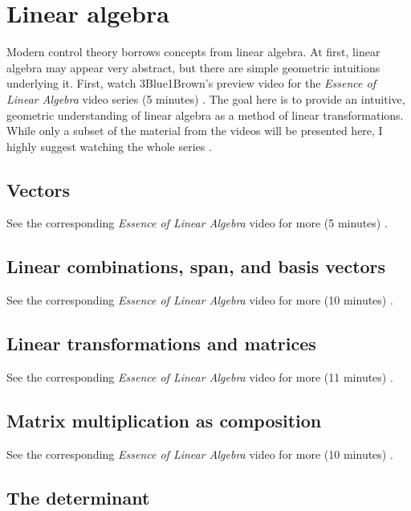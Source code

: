 \chapter{Linear algebra}

Modern control theory borrows concepts from linear algebra. At first, linear
algebra may appear very abstract, but there are simple geometric intuitions
underlying it. First, watch 3Blue1Brown's preview video for the
\textit{Essence of Linear Algebra} video series (5 minutes)
\cite{bib:linalg_preview}. The goal here is to provide an intuitive, geometric
understanding of linear algebra as a method of linear transformations. \\

While only a subset of the material from the videos will be presented here, I
highly suggest watching the whole series \cite{bib:essence_of_linalg}.

\section{Vectors}

See the corresponding \textit{Essence of Linear Algebra} video for more (5
minutes) \cite{bib:linalg_vectors}.

\section{Linear combinations, span, and basis vectors}

See the corresponding \textit{Essence of Linear Algebra} video for more (10
minutes) \cite{bib:linalg_linear_combinations}.

\section{Linear transformations and matrices}

See the corresponding \textit{Essence of Linear Algebra} video for more (11
minutes) \cite{bib:linalg_linear_transformations_and_matrices}.

\section{Matrix multiplication as composition}

See the corresponding \textit{Essence of Linear Algebra} video for more (10
minutes) \cite{bib:linalg_matrix_multiplication_as_composition}.

\section{The determinant}

